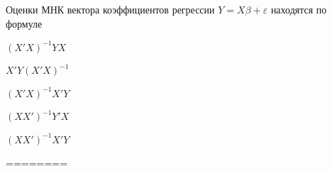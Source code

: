 
\begin{question}
Оценки МНК вектора коэффициентов регрессии \(Y=X\beta + \varepsilon\)
находятся по формуле
\begin{answerlist}
  \item \((X'X)^{-1}YX\)
  \item \(X'Y(X'X)^{-1}\)
  \item \((X'X)^{-1}X'Y\)
  \item \((XX')^{-1}Y'X\)
  \item \((XX')^{-1}X'Y\)
\end{answerlist}
\end{question}

\begin{solution}
========
\end{solution}

